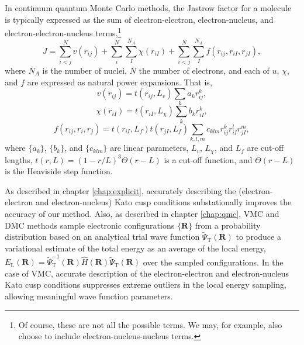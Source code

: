 In continuum quantum Monte Carlo methods, the Jastrow factor for a molecule is typically expressed as the sum of electron-electron, electron-nucleus, and electron-electron-nucleus terms,\footnote{Of course, these are not all the possible terms. We may, for example, also choose to include electron-nucleus-nucleus terms.}
\begin{equation}
    \label{eq:jastrow}
    J = \sum_{i<j}^Nv(r_{ij}) + \sum_i^N\sum_I^{N_A}\chi(r_{iI}) + \sum_{i<j}^N\sum_I^{N_A}f(r_{ij}, r_{iI}, r_{jI}),
\end{equation}
where $N_A$ is the number of nuclei, $N$ the number of electrons, and each of $u$, $\chi$, and $f$ are expressed as natural power expansions.\supercite{drummondJastrow} That is,
\begin{equation}
    \label{eq:dtn-jastrow-ee}
    v(r_{ij})    = t(r_{ij},L_v)
                    \sum_{k} a_k r_{ij}^k ,
\end{equation}
\begin{equation}
    \label{eq:dtn-jastrow-en}
    \chi(r_{iI}) = t(r_{iI},L_\chi)
    \sum_{k} b_k r_{iI}^k ,
\end{equation}
\begin{equation}
    \label{eq:dtn-jastrow-een}
    f(r_{ij}, r_{i}, r_{j}) = t(r_{iI},L_f) t(r_{jI},L_f)
    \sum_{k,l,m} c_{klm}
    r_{ij}^k r_{iI}^l r_{jI}^m ,
\end{equation}
where $\{a_k\}$, $\{b_k\}$, and $\{c_{klm}\}$ are linear parameters,
$L_v$, $L_\chi$, and $L_f$ are cut-off lengths, $t(r,L) = (1-r/L)^3
\Theta(r-L)$ is a cut-off function, and $\Theta(r-L)$ is the Heaviside
step function.

As described in chapter \ref{chap:explicit}, accurately describing the (electron-electron and electron-nucleus) Kato cusp conditions\supercite{katoEigenfunctionsManyparticleSystems1957a} substationally improves the accuracy of our method. Also, as described in chapter \ref{chap:qmc}, \gls{VMC} and \gls{DMC} methods sample electronic configurations $\{\bm R\}$ from a probability distribution based on an analytical trial wave function $\tilde\Psi_{\mathrm T}(\bm R)$ to produce a variational estimate of the total energy as an average of the local energy, $E_{\mathrm L}({\bm R}) = \tilde\Psi_{\mathrm T}^{-1}({\bm R}) \hat H({\bm R}) \tilde\Psi_{\mathrm T}({\bm R})$ over the sampled configurations. In the case of \gls{VMC}, accurate description of the electron-electron and electron-nucleus Kato cusp conditions suppresses extreme outliers in the local energy sampling, allowing meaningful wave function parameters.

